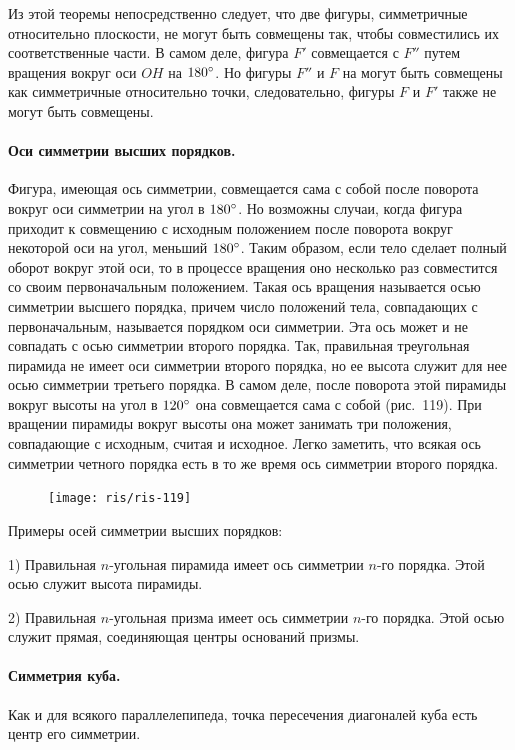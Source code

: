 \documentclass[twoside]{book}
\begin{document}
Из этой теоремы непосредственно следует, что две фигуры, симметричные относительно плоскости, не могут быть совмещены так, чтобы совместились их соответственные части.
В самом деле, фигура $F'$ совмещается с $F''$ путем вращения вокруг оси $OH$ на $180\degree$.
Но фигуры $F''$ и $F$ на могут быть совмещены как симметричные относительно точки, следовательно, фигуры $F$ и $F'$ также не могут быть совмещены. %

\paragraph{Оси симметрии высших порядков.}\label{1938/s103}
Фигура, имеющая ось симметрии, совмещается сама с собой после поворота вокруг оси симметрии на угол в $180\degree$.
Но возможны случаи, когда фигура приходит к совмещению с исходным положением после поворота вокруг некоторой оси на угол, меньший $180\degree$.
Таким образом, если тело сделает полный оборот вокруг этой оси, то в процессе вращения оно несколько раз совместится со своим первоначальным положением.
Такая ось вращения называется осью симметрии высшего порядка, причем число положений тела, совпадающих с первоначальным, называется порядком оси симметрии.
Эта ось может и не совпадать с осью симметрии второго порядка.
Так, правильная треугольная пирамида не имеет оси симметрии второго порядка, но ее высота служит для нее осью симметрии третьего порядка.
В самом деле, после поворота этой пирамиды вокруг высоты на угол в $120\degree$ она совмещается сама с собой (рис.~119).
При вращении пирамиды вокруг высоты она может занимать три положения, совпадающие с исходным, считая и исходное.
Легко заметить, что всякая ось симметрии четного порядка есть в то же время ось симметрии второго порядка.

\begin{figure}[h!]
\centering
\texttt{[image: ris/ris-119]}
\caption{}
\end{figure}

Примеры осей симметрии высших порядков:

1) Правильная $n$-угольная пирамида имеет ось симметрии $n$-го порядка.
Этой осью служит высота пирамиды.

2) Правильная $n$-угольная призма имеет ось симметрии $n$-го порядка.
Этой осью служит прямая, соединяющая центры оснований призмы.

\paragraph{Симметрия куба.}\label{1938/s104}
Как и для всякого параллелепипеда, точка пересечения диагоналей куба есть центр его симметрии.
\end{document}
